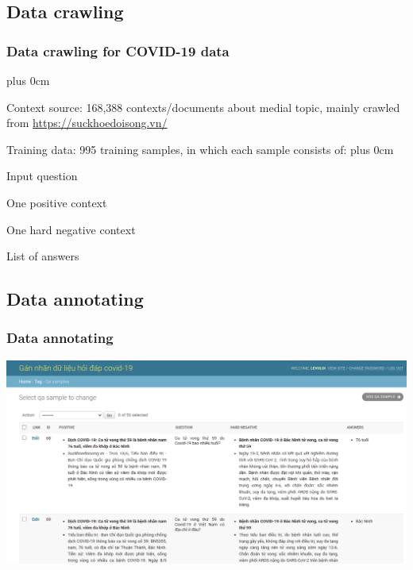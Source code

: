 \documentclass[11pt]{beamer}
\renewcommand{\raggedright}{\leftskip=0pt \rightskip=0pt plus 0cm}
\let\olditemize=\itemize
\renewenvironment{itemize}{\olditemize\raggedright}{\endlist}
\begin{document}
\subsection{Data crawling}
\begin{frame}
\frametitle{Data crawling for COVID-19 data}
\begin{itemize}
\item Context source: 168,388 contexts/documents about medial topic,  mainly crawled from \url{https://suckhoedoisong.vn/}
\item Training data: 995 training samples, in which each sample consists of:
\begin{itemize}
	\item Input question
	\item One positive context
	\item One hard negative context
	\item List of answers
\end{itemize}
\end{itemize}
\end{frame}
\subsection{Data annotating}
\begin{frame}
\frametitle{Data annotating}
\includegraphics[scale=.25]{images/annotate.png}
\end{frame}
\end{document}

